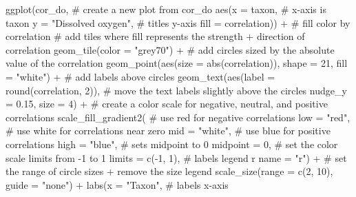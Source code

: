 \documentclass[
  letterpaper,
  DIV=11,
  numbers=noendperiod]{scrartcl}
\newenvironment{Shaded}{\begin{snugshade}}{\end{snugshade}}
\newcommand{\AttributeTok}[1]{\textcolor[rgb]{0.40,0.45,0.13}{#1}}
\newcommand{\CommentTok}[1]{\textcolor[rgb]{0.37,0.37,0.37}{#1}}
\newcommand{\DecValTok}[1]{\textcolor[rgb]{0.68,0.00,0.00}{#1}}
\newcommand{\FloatTok}[1]{\textcolor[rgb]{0.68,0.00,0.00}{#1}}
\newcommand{\FunctionTok}[1]{\textcolor[rgb]{0.28,0.35,0.67}{#1}}
\newcommand{\NormalTok}[1]{\textcolor[rgb]{0.00,0.23,0.31}{#1}}
\newcommand{\SpecialCharTok}[1]{\textcolor[rgb]{0.37,0.37,0.37}{#1}}
\newcommand{\StringTok}[1]{\textcolor[rgb]{0.13,0.47,0.30}{#1}}
\begin{document}
\begin{Shaded}
\begin{Highlighting}[]
\FunctionTok{ggplot}\NormalTok{(cor\_do, }\CommentTok{\# create a new plot from cor\_do}
       \FunctionTok{aes}\NormalTok{(}\AttributeTok{x =}\NormalTok{ taxon, }\CommentTok{\# x{-}axis is taxon}
           \AttributeTok{y =} \StringTok{"Dissolved oxygen"}\NormalTok{, }\CommentTok{\# titles y{-}axis}
           \AttributeTok{fill =}\NormalTok{ correlation)) }\SpecialCharTok{+} \CommentTok{\# fill color by correlation}
  \CommentTok{\# add tiles where fill represents the strength + direction of correlation}
  \FunctionTok{geom\_tile}\NormalTok{(}\AttributeTok{color =} \StringTok{"grey70"}\NormalTok{) }\SpecialCharTok{+}
  \CommentTok{\# add circles sized by the absolute value of the correlation}
  \FunctionTok{geom\_point}\NormalTok{(}\FunctionTok{aes}\NormalTok{(}\AttributeTok{size =} \FunctionTok{abs}\NormalTok{(correlation)), }\AttributeTok{shape =} \DecValTok{21}\NormalTok{, }\AttributeTok{fill =} \StringTok{"white"}\NormalTok{) }\SpecialCharTok{+}
  \CommentTok{\# add labels above circles}
  \FunctionTok{geom\_text}\NormalTok{(}\FunctionTok{aes}\NormalTok{(}\AttributeTok{label =} \FunctionTok{round}\NormalTok{(correlation, }\DecValTok{2}\NormalTok{)),}
            \CommentTok{\# move the text labels slightly above the circles}
            \AttributeTok{nudge\_y =} \FloatTok{0.15}\NormalTok{, }\AttributeTok{size =} \DecValTok{4}\NormalTok{) }\SpecialCharTok{+}
  \CommentTok{\# create a color scale for negative, neutral, and positive correlations}
  \FunctionTok{scale\_fill\_gradient2}\NormalTok{(}
    \CommentTok{\# use red for negative correlations}
    \AttributeTok{low =} \StringTok{"red"}\NormalTok{,}
    \CommentTok{\# use white for correlations near zero}
    \AttributeTok{mid =} \StringTok{"white"}\NormalTok{,}
    \CommentTok{\# use blue for positive correlations}
    \AttributeTok{high =} \StringTok{"blue"}\NormalTok{,}
    \CommentTok{\# sets midpoint to 0}
    \AttributeTok{midpoint =} \DecValTok{0}\NormalTok{,}
    \CommentTok{\# set the color scale limits from {-}1 to 1 }
    \AttributeTok{limits =} \FunctionTok{c}\NormalTok{(}\SpecialCharTok{{-}}\DecValTok{1}\NormalTok{, }\DecValTok{1}\NormalTok{),}
    \CommentTok{\# labels legend \textquotesingle{}r\textquotesingle{}}
    \AttributeTok{name =} \StringTok{"r"}\NormalTok{) }\SpecialCharTok{+}
  \CommentTok{\# set the range of circle sizes + remove the size legend}
  \FunctionTok{scale\_size}\NormalTok{(}\AttributeTok{range =} \FunctionTok{c}\NormalTok{(}\DecValTok{2}\NormalTok{, }\DecValTok{10}\NormalTok{), }\AttributeTok{guide =} \StringTok{"none"}\NormalTok{) }\SpecialCharTok{+}
  \FunctionTok{labs}\NormalTok{(}\AttributeTok{x =} \StringTok{"Taxon"}\NormalTok{, }\CommentTok{\# labels x{-}axis}

\end{Highlighting}
\end{Shaded}
\end{document}
